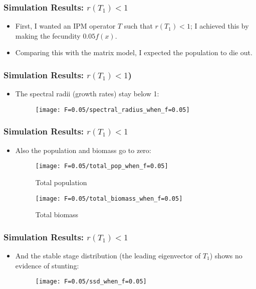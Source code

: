 \documentclass{beamer}
\begin{document}
\begin{frame}
	\frametitle{Simulation Results: $r(T_1) < 1$}
	\begin{itemize}
		\item First, I wanted an IPM operator $T$ such that $r(T_1) < 1$; I achieved this by making the fecundity $0.05f(x)$.
		\pause
		\item Comparing this with the matrix model, I expected the population to die out.
	\end{itemize}
\end{frame}

\begin{frame}
	\frametitle{Simulation Results: $r(T_1) < 1$)}
	\begin{itemize}
			\pause
			\item The spectral radii (growth rates) stay below 1:
			\pause
			\begin{figure}
				\centering
				\texttt{[image: F=0.05/spectral\_radius\_when\_f=0.05]}
			\end{figure}
	\end{itemize}
\end{frame}

\begin{frame}
	\frametitle{Simulation Results: $r(T_1) < 1$}
	\begin{itemize}
		\pause
		\item Also the population and biomass go to zero:
		\pause
		\begin{figure}[H]
			\centering
			\begin{minipage}{.4\textwidth}
				\texttt{[image: F=0.05/total\_pop\_when\_f=0.05]}
				\caption{Total population}
			\end{minipage} \quad 
			\centering
			\begin{minipage}{.4\textwidth}
				\texttt{[image: F=0.05/total\_biomass\_when\_f=0.05]}
				\caption{Total biomass}
			\end{minipage}
		\end{figure}
	\end{itemize}
\end{frame}

\begin{frame}
	\frametitle{Simulation Results: $r(T_1) < 1$}
	\begin{itemize}
		\pause
		\item And the stable stage distribution (the leading eigenvector of $T_1$) shows no evidence of stunting:
		
		\begin{figure}
			\centering
			\texttt{[image: F=0.05/ssd\_when\_f=0.05]}
		\end{figure}
	\end{itemize}
\end{frame}
\end{document}

